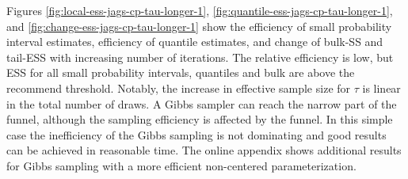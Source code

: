 \documentclass[american,]{article}
\theoremstyle{definition}
\begin{document}
Figures \ref{fig:local-ess-jags-cp-tau-longer-1},
\ref{fig:quantile-ess-jags-cp-tau-longer-1}, and
\ref{fig:change-ess-jags-cp-tau-longer-1} show the efficiency of small
probability interval estimates, efficiency of quantile estimates, and
change of bulk-SS and tail-ESS with increasing number of
iterations. The relative efficiency is low, but ESS for all small
probability intervals, quantiles and bulk are above the recommend
threshold. Notably, the increase in effective sample size for
$\tau$ is linear in the total number of draws.  A Gibbs sampler can
reach the narrow part of the funnel, although the sampling efficiency
is affected by the funnel. In this simple case the inefficiency of the
Gibbs sampling is not dominating and good results can be achieved in
reasonable time. The online appendix shows additional results for Gibbs
sampling with a more efficient non-centered parameterization.
\end{document}

